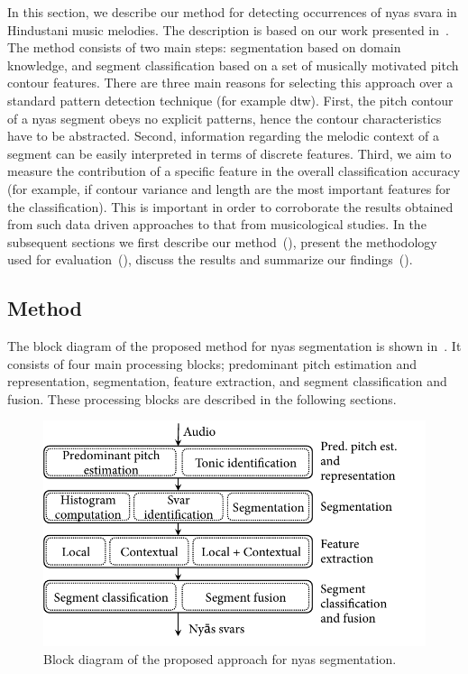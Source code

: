 {In this section, we describe our method for detecting occurrences of \gls{nyas} \gls{svara} in Hindustani music melodies. The description is based on our work presented in~\cite{gulati2014Landmark}. The method consists of two main steps: segmentation based on domain knowledge, and segment classification based on a set of musically motivated pitch contour features. There are three main reasons for selecting this approach over a standard pattern detection technique (for example \gls{dtw}). First, the pitch contour of a \gls{nyas} segment obeys no explicit patterns, hence the contour characteristics have to be abstracted. Second, information regarding the melodic context of a segment can be easily interpreted in terms of discrete features. Third, we aim to measure the contribution of a specific feature in the overall classification accuracy (for example, if contour variance and length are the most important features for the classification). This is important in order to corroborate the results obtained from such data driven approaches to that from musicological studies. In the subsequent sections we first describe our method~(), present the methodology used for evaluation~(), discuss the results and summarize our findings~().

\subsection{Method}
\label{sec:pre_processing_nyas_id_method}

The block diagram of the proposed method for \gls{nyas} segmentation is shown in~. It consists of four main processing blocks; predominant pitch estimation and representation, segmentation, feature extraction, and segment classification and fusion. These processing blocks are described in the following sections.

\begin{figure}
	\begin{center}
		\includegraphics[width=\figSizeEightyFive]{ch05_preprocessing/figures/BlockDiagramNyasSegmentation.pdf}
	\end{center}
	\caption{Block diagram of the proposed approach for \gls{nyas} segmentation.}
	\label{fig:bd_nyas_segmentation}
\end{figure}

}
